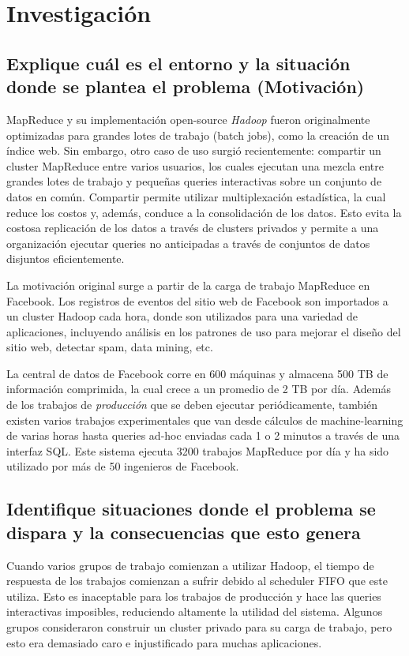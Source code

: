 \section{Investigación}

\subsection{Explique cuál es el entorno y la situación donde se plantea el problema (Motivación)}

MapReduce y su implementación open-source \textit{Hadoop} fueron originalmente optimizadas para grandes lotes de trabajo (batch jobs), como la creación de un índice web. Sin embargo, otro caso de uso surgió recientemente: compartir un cluster MapReduce entre varios usuarios, los cuales ejecutan una mezcla entre grandes lotes de trabajo y pequeñas queries interactivas sobre un conjunto de datos en común. Compartir permite utilizar multiplexación estadística, la cual reduce los costos y, además, conduce a la consolidación de los datos. Esto evita la costosa replicación de los datos a través de clusters privados y permite a una organización ejecutar queries no anticipadas a través de conjuntos de datos disjuntos eficientemente.

La motivación original surge a partir de la carga de trabajo MapReduce en Facebook. Los registros de eventos del sitio web de Facebook son importados a un cluster Hadoop cada hora, donde son utilizados para una variedad de aplicaciones, incluyendo análisis en los patrones de uso para mejorar el diseño del sitio web, detectar spam, data mining, etc.

La central de datos de Facebook corre en 600 máquinas y almacena 500 TB de información comprimida, la cual crece a un promedio de 2 TB por día. Además de los trabajos de \textit{producción} que se deben ejecutar periódicamente, también existen varios trabajos experimentales que van desde cálculos de machine-learning de varias horas hasta queries ad-hoc enviadas cada 1 o 2 minutos a través de una interfaz SQL. Este sistema ejecuta 3200 trabajos MapReduce por día y ha sido utilizado por más de 50 ingenieros de Facebook.


\subsection{Identifique situaciones donde el problema se dispara y la consecuencias que esto genera}

Cuando varios grupos de trabajo comienzan a utilizar Hadoop, el tiempo de respuesta de los trabajos comienzan a sufrir debido al scheduler FIFO que este utiliza. Esto es inaceptable para los trabajos de producción y hace las queries interactivas imposibles, reduciendo altamente la utilidad del sistema. Algunos grupos consideraron construir un cluster privado para su carga de trabajo, pero esto era demasiado caro e injustificado para muchas aplicaciones.

